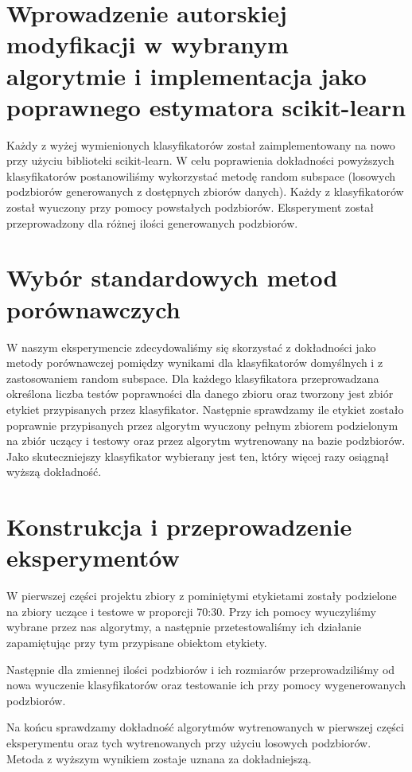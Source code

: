 \documentclass[12pt,onecolumn,technote]{IEEEtran}
\begin{document}
\section{Wprowadzenie autorskiej modyfikacji w wybranym algorytmie i implementacja jako poprawnego estymatora scikit-learn}

Każdy z wyżej wymienionych klasyfikatorów został zaimplementowany na nowo przy użyciu biblioteki scikit-learn. W celu poprawienia dokładności powyższych klasyfikatorów postanowiliśmy wykorzystać metodę random subspace (losowych podzbiorów generowanych z dostępnych zbiorów danych). Każdy z klasyfikatorów został wyuczony przy pomocy powstałych podzbiorów. Eksperyment został przeprowadzony dla różnej ilości generowanych podzbiorów.

\section{Wybór standardowych metod porównawczych}

W naszym eksperymencie zdecydowaliśmy się skorzystać z dokładności jako metody porównawczej pomiędzy wynikami dla klasyfikatorów domyślnych i z zastosowaniem random subspace. Dla każdego klasyfikatora przeprowadzana określona liczba testów poprawności dla danego zbioru oraz tworzony jest zbiór etykiet przypisanych przez klasyfikator. Następnie sprawdzamy ile etykiet zostało poprawnie przypisanych przez algorytm wyuczony pełnym zbiorem podzielonym na zbiór uczący i testowy oraz przez algorytm wytrenowany na bazie podzbiorów. Jako skuteczniejszy klasyfikator wybierany jest ten, który więcej razy osiągnął wyższą dokładność.

\section{Konstrukcja i przeprowadzenie eksperymentów}

W pierwszej części projektu zbiory z pominiętymi etykietami zostały podzielone na zbiory uczące i testowe w proporcji 70:30. Przy ich pomocy wyuczyliśmy wybrane przez nas algorytmy, a następnie przetestowaliśmy ich działanie zapamiętując przy tym przypisane obiektom etykiety.

Następnie dla zmiennej ilości podzbiorów i ich rozmiarów przeprowadziliśmy od nowa wyuczenie klasyfikatorów oraz testowanie ich przy pomocy wygenerowanych podzbiorów.

Na końcu sprawdzamy dokładność algorytmów wytrenowanych w pierwszej części eksperymentu oraz tych wytrenowanych przy użyciu losowych podzbiorów. Metoda z wyższym wynikiem zostaje uznana za dokładniejszą.
\end{document}
